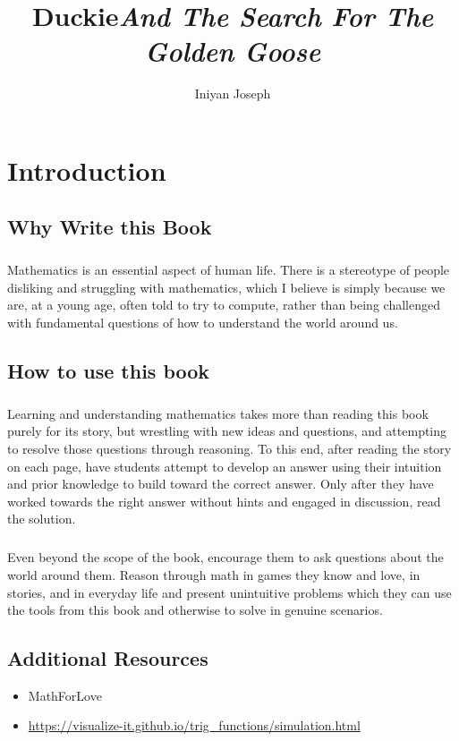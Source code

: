 \documentclass[a4paper,11pt ]{book}
\title{\textbf{Duckie}\linebreak \textit{And The Search For The Golden Goose}}
\date{}
\author{Iniyan Joseph}
\begin{document}
\maketitle
\chapter*{Introduction}
\section*{Why Write this Book}

\paragraph*{} Mathematics is an essential aspect of human life. There is a stereotype of people disliking and struggling with mathematics, which I believe is simply because we are, at a young age, often told to try to compute, rather than being challenged with fundamental questions of how to understand the world around us. 
\section*{How to use this book}
\paragraph*{} Learning and understanding mathematics takes more than reading this book purely for its story, but wrestling with new ideas and questions, and attempting to resolve those questions through reasoning. To this end, after reading the story on each page, have students attempt to develop an answer using their intuition and prior knowledge to build toward the correct answer. Only after they have worked towards the right answer without hints and engaged in discussion, read the solution.
\paragraph{} Even beyond the scope of the book, encourage them to ask questions about the world around them. Reason through math in games they know and love, in stories, and in everyday life and present unintuitive problems which they can use the tools from this book and otherwise to solve in genuine scenarios. 
\section*{Additional Resources} 
\begin{itemize}
\item MathForLove
\item \url{https://visualize-it.github.io/trig_functions/simulation.html}
\end{itemize}
\tableofcontents
\vfill
\pagebreak
\end{document}
